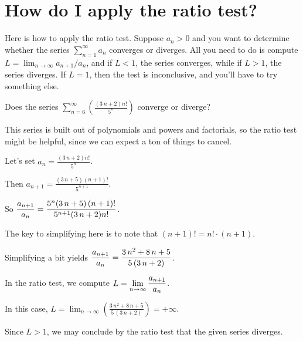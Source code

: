 \documentclass{ximera}
\begin{document}
\section{How do I apply the ratio test?}

Here is how to apply the ratio test.  Suppose \(a_n > 0\) and you want to determine whether the series \(\sum_{n=1}^\infty a_n\) converges or diverges.  All you need to do is compute \(L = \displaystyle\lim_{n\to\infty} a_{n+1}/a_n\), and if \(L < 1\), the series converges, while if \(L > 1\), the series diverges.  If \(L = 1\), then the test is inconclusive, and you'll have to try something else.

\begin{question}
  Does the series \(\displaystyle\sum_{n=6}^\infty \left( \displaystyle\frac{ {\left(3 \, n + 2\right)} n!}{5^{n} } \right)\) converge or diverge?

  \begin{solution}
    \begin{hint}
      This series is built out of polynomials and powers and factorials, so the ratio test might be helpful, since we can expect a ton of things to cancel.
    \end{hint}
    \begin{hint}
      Let's set \(a_n = \displaystyle\frac{ {\left(3 \, n + 2\right)} n!}{5^{n} }\).
    \end{hint}
    \begin{hint}
      Then \(a_{n+1} = \displaystyle\frac{ {\left(3 \, n + 5\right)} \left(n + 1\right)!}{5^{n + 1} }\).
    \end{hint}
    \begin{hint}
      So \(\displaystyle\displaystyle\frac{a_{n+1} }{a_n} = \displaystyle\frac{5^{n} {\left(3 \, n + 5\right)} \left(n + 1\right)!}{5^{n + 1} {\left(3 \, n + 2\right)} n!}\).
    \end{hint}
    \begin{hint}
      The key to simplifying here is to note that \(\left(n + 1\right)! = n! \cdot (n + 1)\).
    \end{hint}
    \begin{hint}
      Simplifying a bit yields \(\displaystyle\displaystyle\frac{a_{n+1} }{a_n} = \displaystyle\frac{3 \, n^{2} + 8 \, n + 5}{5 \, {\left(3 \, n + 2\right)} }\).
    \end{hint}
    \begin{hint}
      In the ratio test, we compute \(L = \displaystyle\lim_{n \to \infty} \displaystyle\displaystyle\frac{a_{n+1} }{a_n}\).
    \end{hint}
    \begin{hint}
      In this case, \(L = \displaystyle\lim_{n \to \infty} \left( \displaystyle\frac{3 \, n^{2} + 8 \, n + 5}{5 \, {\left(3 \, n + 2\right)} } \right) = +\infty\).
    \end{hint}
    \begin{hint}
      Since \(L > 1\), we may conclude by the ratio test that the given series diverges.
      

\end{hint}
\end{solution}
\end{question}
\end{document}
